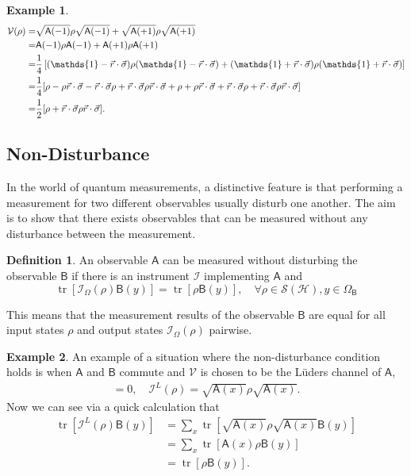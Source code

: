 \documentclass[a4paper,12pt]{wihuri}
\theoremstyle{definition}
\newtheorem{definition}{Definition}
\newtheorem{example}{Example}
\numberwithin{definition}{section}
\numberwithin{example}{section}
\numberwithin{theorem}{section}
\numberwithin{proposition}{section}
\numberwithin{lemma}{section}
\newcommand{\I}{\mathcal{I}}%
\newcommand{\hi}{\mathcal{H}}%
\newcommand{\tila}{\mathcal{S}}%
\newcommand{\V}{\mathcal{V}}%
\newcommand{\A}{\mathsf{A}}%
\newcommand{\B}{\mathsf{B}}%
\newcommand{\id}{\mathds{1}}
\DeclareMathOperator{\tr}{tr}
\begin{document}
\begin{example}
\begin{align*}
\V(\rho) =& \sqrt{\A(-1)}\rho\sqrt{\A(-1)} + \sqrt{\A(+1)}\rho\sqrt{\A(+1)}\\
=& \A(-1)\rho\A(-1) + \A(+1)\rho\A(+1) \\
=&\dfrac{1}{4} \left[(\id - \vec{r}\cdot\vec{\sigma})\rho(\id - \vec{r}\cdot\vec{\sigma}) + (\id + \vec{r}\cdot\vec{\sigma})\rho(\id + \vec{r}\cdot\vec{\sigma}) \right] \\
=&\dfrac{1}{4} [ \rho -\rho\vec{r}\cdot\vec{\sigma} - \vec{r}\cdot\vec{\sigma}\rho + \vec{r}\cdot\vec{\sigma}\rho\vec{r}\cdot\vec{\sigma} + \rho + \rho\vec{r}\cdot\vec{\sigma} + \vec{r}\cdot\vec{\sigma}\rho + \vec{r}\cdot\vec{\sigma}\rho\vec{r}\cdot\vec{\sigma}] \\
=&\dfrac{1}{2}[\rho + \vec{r}\cdot\vec{\sigma}\rho\vec{r}\cdot\vec{\sigma}]\text.
\end{align*}

\end{example}
\subsection{Non-Disturbance}
In the world of quantum measurements, a distinctive feature is that performing a measurement for two different observables usually disturb one another. The aim is to show that there exists observables that can be measured without any disturbance between the measurement. 
\begin{definition}
An observable $\A$ can be measured without disturbing the observable $\B$ if there is an instrument $\I$ implementing $\A$ and 
\begin{equation}\label{nondisturbance} 
\tr[\I_{\Omega}(\rho)\B(y)] = \tr[\rho \B(y)], \quad \forall \rho \in \tila(\hi), y \in \Omega_{\B}
\end{equation}
\end{definition}
This means that the measurement results of the observable $\B$ are equal for all input states $\rho$ and output states $\I_{\Omega}(\rho)$ pairwise. 

\begin{example}
An example of a situation where the non-disturbance condition holds is when $\A$ and $\B$ commute and $\V$ is chosen to be the Lüders channel of $\A$,
\begin{align*}
[\A, \B] = 0,\quad \I^L(\rho) = \sqrt{\A(x)}\rho\sqrt{\A(x)}\text{.}
\end{align*}
Now we can see via a quick calculation that
\begin{align*}
\tr[\I^L(\rho)\B(y)] &= \sum_x\tr[\sqrt{\A(x)}\rho\sqrt{\A(x)}\B(y)] \\
&= \sum_x\tr[\A(x)\rho \B(y)] \\
&= \tr[\rho \B(y)]\text{.}
\end{align*}
\end{example}
\end{document}
